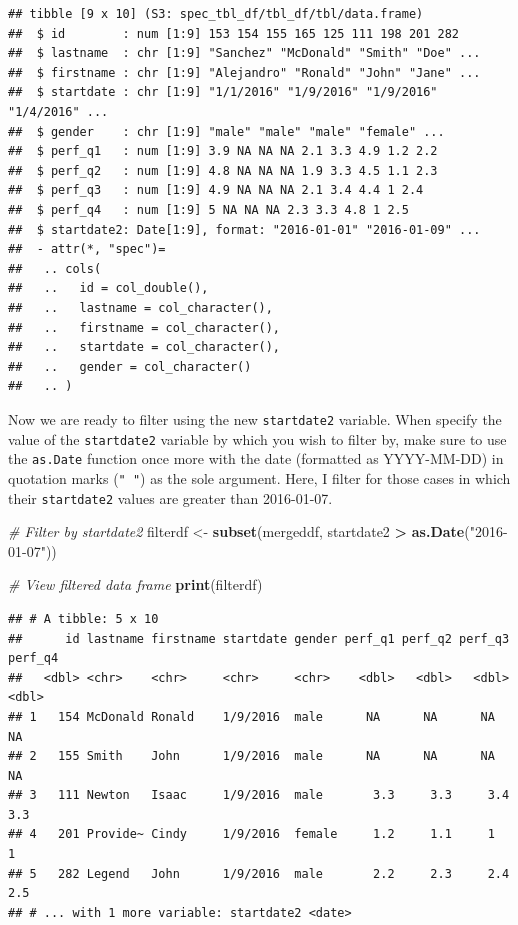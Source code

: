 \documentclass[]{book}
\newenvironment{Shaded}{\begin{snugshade}}{\end{snugshade}}
\newcommand{\KeywordTok}[1]{\textcolor[rgb]{0.13,0.29,0.53}{\textbf{#1}}}
\newcommand{\StringTok}[1]{\textcolor[rgb]{0.31,0.60,0.02}{#1}}
\newcommand{\CommentTok}[1]{\textcolor[rgb]{0.56,0.35,0.01}{\textit{#1}}}
\newcommand{\OperatorTok}[1]{\textcolor[rgb]{0.81,0.36,0.00}{\textbf{#1}}}
\newcommand{\NormalTok}[1]{#1}
\begin{document}
\begin{verbatim}
## tibble [9 x 10] (S3: spec_tbl_df/tbl_df/tbl/data.frame)
##  $ id        : num [1:9] 153 154 155 165 125 111 198 201 282
##  $ lastname  : chr [1:9] "Sanchez" "McDonald" "Smith" "Doe" ...
##  $ firstname : chr [1:9] "Alejandro" "Ronald" "John" "Jane" ...
##  $ startdate : chr [1:9] "1/1/2016" "1/9/2016" "1/9/2016" "1/4/2016" ...
##  $ gender    : chr [1:9] "male" "male" "male" "female" ...
##  $ perf_q1   : num [1:9] 3.9 NA NA NA 2.1 3.3 4.9 1.2 2.2
##  $ perf_q2   : num [1:9] 4.8 NA NA NA 1.9 3.3 4.5 1.1 2.3
##  $ perf_q3   : num [1:9] 4.9 NA NA NA 2.1 3.4 4.4 1 2.4
##  $ perf_q4   : num [1:9] 5 NA NA NA 2.3 3.3 4.8 1 2.5
##  $ startdate2: Date[1:9], format: "2016-01-01" "2016-01-09" ...
##  - attr(*, "spec")=
##   .. cols(
##   ..   id = col_double(),
##   ..   lastname = col_character(),
##   ..   firstname = col_character(),
##   ..   startdate = col_character(),
##   ..   gender = col_character()
##   .. )
\end{verbatim}

Now we are ready to filter using the new \texttt{startdate2} variable.
When specify the value of the \texttt{startdate2} variable by which you
wish to filter by, make sure to use the \texttt{as.Date} function once
more with the date (formatted as YYYY-MM-DD) in quotation marks
(\texttt{"\ "}) as the sole argument. Here, I filter for those cases in
which their \texttt{startdate2} values are greater than 2016-01-07.

\begin{Shaded}
\begin{Highlighting}[]
\CommentTok{# Filter by startdate2}
\NormalTok{filterdf <-}\StringTok{ }\KeywordTok{subset}\NormalTok{(mergeddf, startdate2 }\OperatorTok{>}\StringTok{ }\KeywordTok{as.Date}\NormalTok{(}\StringTok{"2016-01-07"}\NormalTok{))}

\CommentTok{# View filtered data frame}
\KeywordTok{print}\NormalTok{(filterdf)}
\end{Highlighting}
\end{Shaded}

\begin{verbatim}
## # A tibble: 5 x 10
##      id lastname firstname startdate gender perf_q1 perf_q2 perf_q3 perf_q4
##   <dbl> <chr>    <chr>     <chr>     <chr>    <dbl>   <dbl>   <dbl>   <dbl>
## 1   154 McDonald Ronald    1/9/2016  male      NA      NA      NA      NA  
## 2   155 Smith    John      1/9/2016  male      NA      NA      NA      NA  
## 3   111 Newton   Isaac     1/9/2016  male       3.3     3.3     3.4     3.3
## 4   201 Provide~ Cindy     1/9/2016  female     1.2     1.1     1       1  
## 5   282 Legend   John      1/9/2016  male       2.2     2.3     2.4     2.5
## # ... with 1 more variable: startdate2 <date>
\end{verbatim}
\end{document}
